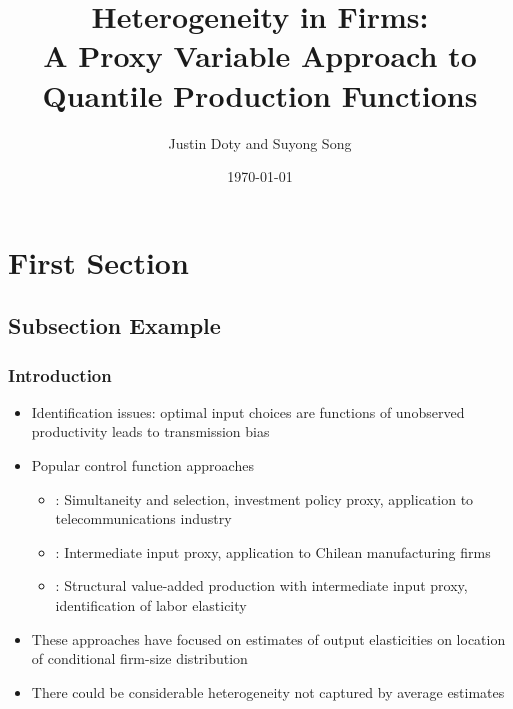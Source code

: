 \documentclass{beamer}
\title[Quantile Production Functions]{Heterogeneity in Firms:\\
A Proxy Variable Approach to Quantile Production Functions}
\author{Justin Doty and Suyong Song} %
\institute[] %
{
\\  
\medskip %
}
\date{\today} %
\begin{document}
\begin{frame}
\titlepage %
\end{frame}


\section{First Section} %

\subsection{Subsection Example} %

\begin{frame}
\frametitle{Introduction}
\begin{itemize}
\item Identification issues: optimal input choices are functions of unobserved productivity leads to transmission bias
\item Popular control function approaches
\begin{itemize}
	\item \textcite{Olley1996}: Simultaneity and selection, investment policy proxy, application to telecommunications industry
	\item \textcite{Levinsohn2003}: Intermediate input proxy, application to Chilean manufacturing firms
	\item \textcite{Ackerberg2015}: Structural value-added production with intermediate input proxy, identification of labor elasticity
\end{itemize}
\item These approaches have focused on estimates of output elasticities on location of conditional firm-size distribution
\item There could be considerable heterogeneity not captured by average estimates
\end{itemize}
\end{frame}
\end{document}
